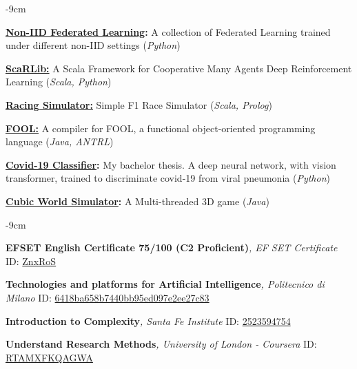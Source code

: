 \documentclass[10pt,a4paper]{altacv}
\begin{document}
\begin{adjustwidth}{}{-9cm}

    \textbf{\href{https://github.com/davidedomini/experiments-2025-lmcs-field-based-FL-baselines}{Non-IID Federated Learning}:} A collection of Federated Learning trained under different non-IID settings (\textit{Python})

    \divider

    \textbf{\href{https://github.com/ScaRLib-group/ScaRLib}{ScaRLib:}} A Scala Framework for Cooperative Many Agents Deep Reinforcement Learning (\textit{Scala, Python}) 
    
    \divider
    
    \textbf{\href{https://davidedomini.github.io/pps-22-sim-race/}{Racing Simulator:}} Simple F1 Race Simulator (\textit{Scala, Prolog})
    
    \divider
    
    \textbf{\href{https://github.com/davidedomini/FOOL-Compiler}{FOOL:}} A compiler for FOOL, a functional object-oriented programming language (\textit{Java, ANTRL})
    
    \divider
    
    \textbf{\href{https://amslaurea.unibo.it/24243/}{Covid-19 Classifier}:} My bachelor thesis. A deep neural network, with vision transformer, trained to discriminate covid-19 from viral pneumonia (\textit{Python}) 
    
    \divider
    
    \textbf{\href{https://github.com/davidedomini/CubicWorldSimulator}{Cubic World Simulator}:} A Multi-threaded 3D game (\textit{Java}) 
\end{adjustwidth}

\begin{adjustwidth}{}{-9cm}

    \textbf{EFSET English Certificate 75/100 (C2 Proficient)}\textit{, EF SET Certificate} ID: \href{https://www.efset.org/cert/ZnxRoS}{ZnxRoS}

    \divider

    \textbf{Technologies and platforms for Artificial Intelligence}\textit{, Politecnico di Milano} \newline ID: \href{https://www.pok.polimi.it/certificates/6418ba658b7440bb95ed097e2ee27c83}{6418ba658b7440bb95ed097e2ee27c83}

    \divider

    \textbf{Introduction to Complexity}\textit{, Santa Fe Institute} ID: \href{https://www.complexityexplorer.org/courses/144-introduction-to-complexity/certificates/2523594754}{2523594754}

    \divider

    \textbf{Understand Research Methods}\textit{, University of London - Coursera} ID: \href{https://www.coursera.org/account/accomplishments/certificate/RTAMXFKQAGWA}{RTAMXFKQAGWA}

\end{adjustwidth}
\end{document}
